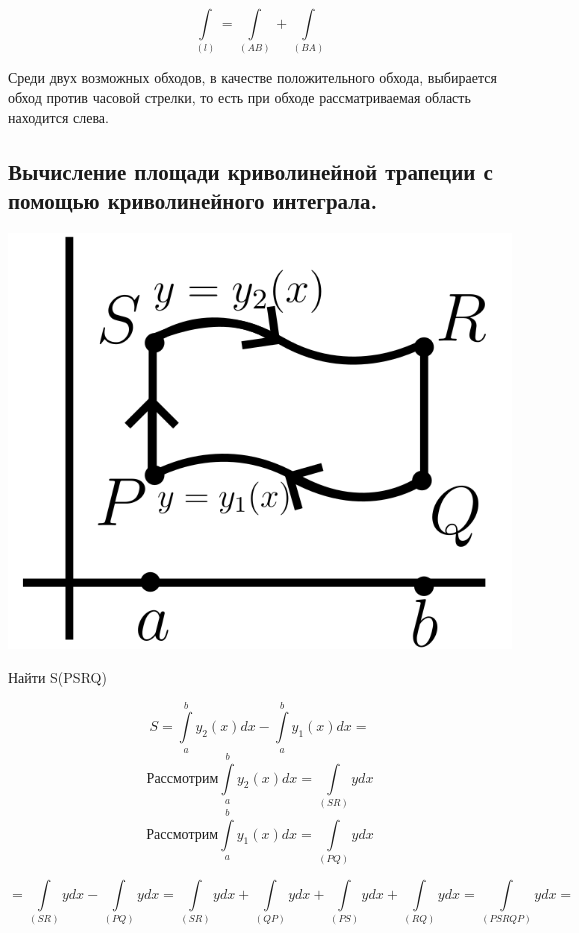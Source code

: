\documentclass[12pt]{article}
\let\ORIincludegraphics\includegraphics
\renewcommand{\includegraphics}[2][]{\ORIincludegraphics[scale=0.65,#1]{#2}}
\let\oldint\int
\renewcommand{\int}{\oldint\limits}
\begin{document}
  \hspace{1em}
  \begin{minipage}{0.25\textwidth}
    \[\int_{(l)}=\int_{(AB)}+\int_{(BA)}\]
  \end{minipage}
  \vspace{1em}
  \par
  Среди двух возможных обходов, в качестве положительного обхода, выбирается обход против часовой стрелки, то есть при обходе
  рассматриваемая область находится слева.

  \subsection{Вычисление площади криволинейной трапеции с помощью криволинейного интеграла.}
  \begin{minipage}{0.45\textwidth}
    \includegraphics[scale=0.6]{8.5.1.png} %
  \end{minipage}
  \hspace{1em}
  \begin{minipage}{0.55\textwidth}
    \begin{center}
      Найти S(PSRQ)
    \end{center}
    \[S=\int_{a}^{b}y_2(x)dx-\int_{a}^{b}y_1(x)dx \boxed{=}\]
     \[\text{Рассмотрим} \int_{a}^{b}y_2(x)dx=\int_{(SR)}ydx\]
      \[\text{Рассмотрим}\int_{a}^{b}y_1(x)dx=\int_{(PQ)}ydx\]
  \end{minipage}
  \vspace{1em}
  \[\boxed{=} \int_{(SR)}ydx-\int_{(PQ)}ydx=\int_{(SR)}ydx+\int_{(QP)}ydx+\int_{(PS)}ydx+\int_{(RQ)}ydx=\int_{(PSRQP)}ydx \boxed{=}\]
\end{document}
